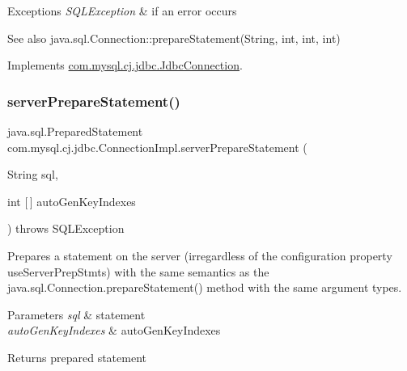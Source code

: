 \begin{DoxyExceptions}{Exceptions}
{\em S\+Q\+L\+Exception} & if an error occurs\\
\hline
\end{DoxyExceptions}
\begin{DoxySeeAlso}{See also}
java.\+sql.\+Connection\+::prepare\+Statement(\+String, int, int, int) 
\end{DoxySeeAlso}


Implements \mbox{\hyperlink{interfacecom_1_1mysql_1_1cj_1_1jdbc_1_1_jdbc_connection_a0c300ea92f3c97874b104b5e999b440b}{com.\+mysql.\+cj.\+jdbc.\+Jdbc\+Connection}}.

\mbox{\label{classcom_1_1mysql_1_1cj_1_1jdbc_1_1_connection_impl_a19b32ebaabe6dbd19ce2dd4ca4b3e5eb}} 
\subsubsection{\texorpdfstring{server\+Prepare\+Statement()}{serverPrepareStatement()}\hspace{0.1cm}{\footnotesize\ttfamily [5/6]}}
{\footnotesize\ttfamily java.\+sql.\+Prepared\+Statement com.\+mysql.\+cj.\+jdbc.\+Connection\+Impl.\+server\+Prepare\+Statement (\begin{DoxyParamCaption}\item[{String}]{sql,  }\item[{int \mbox{[}$\,$\mbox{]}}]{auto\+Gen\+Key\+Indexes }\end{DoxyParamCaption}) throws S\+Q\+L\+Exception}

Prepares a statement on the server (irregardless of the configuration property \textquotesingle{}use\+Server\+Prep\+Stmts\textquotesingle{}) with the same semantics as the java.\+sql.\+Connection.\+prepare\+Statement() method with the same argument types.


\begin{DoxyParams}{Parameters}
{\em sql} & statement \\
\hline
{\em auto\+Gen\+Key\+Indexes} & auto\+Gen\+Key\+Indexes \\
\hline
\end{DoxyParams}
\begin{DoxyReturn}{Returns}
prepared statement 
\end{DoxyReturn}

